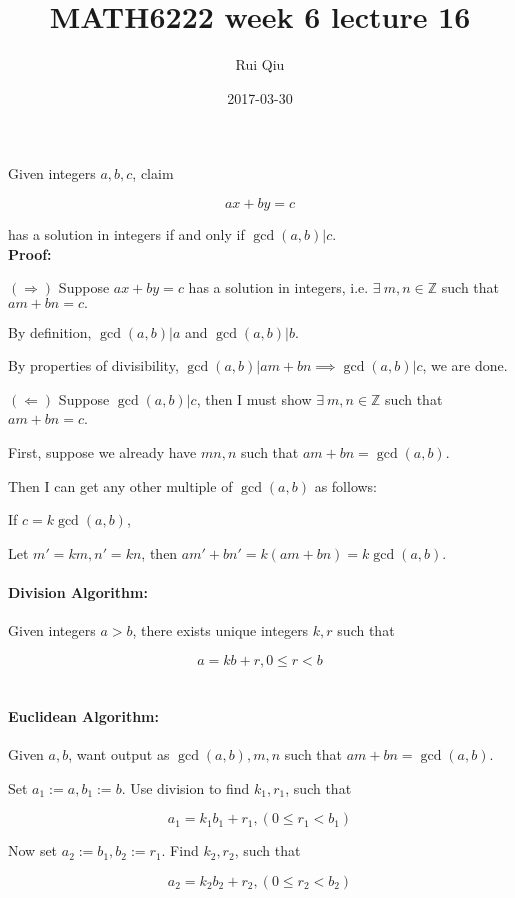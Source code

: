 \documentclass[a4paper, 11pt, twoside]{article}
\begin{document}
\title{MATH6222 week 6 lecture 16}
\author{Rui Qiu}
\date{2017-03-30}

\maketitle

Given integers $a,b,c$, claim

\[ax+by=c\]

has a solution in integers if and only if $\gcd(a,b)|c$.\\

\textbf{Proof:}

$(\Rightarrow)$ Suppose $ax+by=c$ has a solution in integers, i.e. $\exists\ m,n \in \mathbb{Z}$ such that $am+bn=c.$

By definition, $\gcd(a,b)|a$ and $\gcd(a,b)|b$.

By properties of divisibility, $\gcd(a,b)|am+bn\implies \gcd(a,b)|c$, we are done.

$(\Leftarrow)$ Suppose $\gcd(a,b)|c$, then I must show $\exists\ m,n\in\mathbb{Z}$ such that $am+bn=c$.

First, suppose we already have $mn,n$ such that $am+bn=\gcd(a,b)$.

Then I can get any other multiple of $\gcd(a,b)$ as follows:

If $c=k\gcd(a,b)$,

Let $m'=km, n'=kn$, then $am'+bn'=k(am+bn)=k\gcd(a,b).$\\

\paragraph{Division Algorithm:} Given integers $a > b$, there exists unique integers $k, r$ such that 

\[a=kb+r, 0\leq r < b\]\\

\paragraph{Euclidean Algorithm:} Given $a,b$, want output as $\gcd(a,b),m,n$ such that $am+bn=\gcd(a,b)$.

Set $a_1:=a,b_1:=b$. Use division to find $k_1, r_1$, such that

\[a_1=k_1b_1+r_1, (0\leq r_1< b_1)\]

Now set $a_2:=b_1, b_2:=r_1$. Find $k_2, r_2$, such that 

\[a_2 = k_2b_2+r_2, (0\leq r_2< b_2)\]
\end{document}
